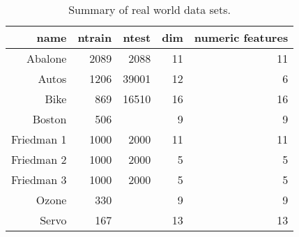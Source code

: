 \begin{table}[ht]
\begin{center}
\begin{tabular}{rrrrr}
  \hline
name & ntrain & ntest & dim & numeric features \\ 
  \hline
Abalone & 2089 & 2088 & 11 & 11 \\ 
  Autos & 1206 & 39001 & 12 & 6 \\ 
  Bike & 869 & 16510 & 16 & 16 \\ 
  Boston & 506 &  & 9 & 9 \\ 
  Friedman 1 & 1000 & 2000 & 11 & 11 \\ 
  Friedman 2 & 1000 & 2000 & 5 & 5 \\ 
  Friedman 3 & 1000 & 2000 & 5 & 5 \\ 
  Ozone & 330 &  & 9 & 9 \\ 
  Servo & 167 &  & 13 & 13 \\ 
   \hline
\end{tabular}
\caption{Summary of real world data sets.} 
\label{tbl:dssummary}
\end{center}
\end{table}
